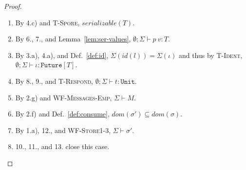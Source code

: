 \begin{proof}
\begin{itemize}
\begin{enumerate}
\item By 4.c) and \textsc{T-Spore}, $serializable(T)$.
\item By 6., 7., and Lemma~\ref{lem:ser-values}, $\emptyset ; \Sigma \vdash p~v : T$.
\item By 3.a), 4.a), and Def.~\ref{def:id}, $\Sigma(id(l)) = \Sigma(\iota)$ and thus by \textsc{T-Ident}, $\emptyset ; \Sigma \vdash \iota : \texttt{Future}[T]$.
\item By 8., 9., and \textsc{T-Respond}, $\emptyset ; \Sigma \vdash t : \texttt{Unit}$.
\item By 2.g) and \textsc{WF-Messages-Emp}, $\Sigma \vdash M$.
\item By 2.f) and Def.~\ref{def:consume}, $dom(\sigma') \subseteq dom(\sigma)$.
\item By 1.a), 12., and \textsc{WF-Store1-3}, $\Sigma \vdash \sigma'$.
\item 10., 11., and 13. close this case.
\end{enumerate}


\end{itemize}
\end{proof}
